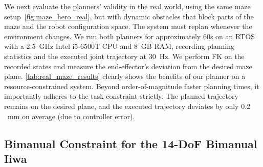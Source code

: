 \documentclass[letterpaper, 10 pt, conference]{ieeeconf}
\begin{document}


We next evaluate the planners' validity in the real world, using the same maze setup~\cref{fig:maze_hero_real}, but with dynamic obstacles that block parts of the maze and the robot configuration space. The system must replan whenever the environment changes. We run both planners for approximately $60$s on an RTOS with a 2.5~GHz Intel i5-6500T CPU and 8~GB RAM, recording planning statistics and the executed joint trajectory at 30~Hz. We perform FK on the recorded states and measure the end-effector's deviation from the desired maze plane. \cref{tab:real_maze_results} clearly shows the benefits of our planner on a resource-constrained system. Beyond order-of-magnitude faster planning times, it importantly adheres to the task-constraint strictly. The planned trajectory remains on the desired plane, and the executed trajectory deviates by only $0.2$~mm on average (due to controller error).








\subsection{Bimanual Constraint for the 14-DoF Bimanual Iiwa}
\end{document}

